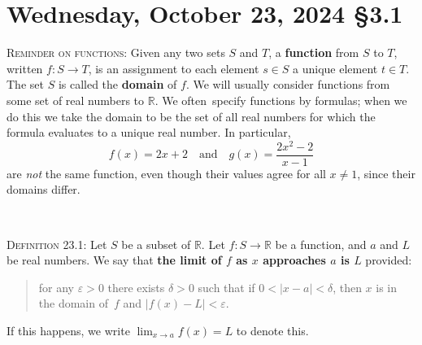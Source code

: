 \documentclass[12pt]{amsart}
\def\de{\delta}
\def\ds{\displaystyle}
\def\We{Wednesday}
\def\e{\varepsilon}
\newcommand{\R}{{\mathbb{R}}}
\numberwithin{equation}{section}
\theoremstyle{plain} %
\newcommand{\Oct}[3]{\section{#2, October #1, 2024 \quad \S#3}}
\theoremstyle{definition}
\theoremstyle{remark}
\begin{document}
\newpage

\Oct{23}{\We}{3.1}

	
\begin{framed}
\noindent	\textsc{Reminder on functions:} Given any two sets $S$ and $T$, a \textbf{function} from $S$ to $T$, written ${f: S\to T}$, is an assignment to each element $s\in S$ a unique element $t\in T$. The set $S$ is called the \textbf{domain} of $f$. We will usually consider functions from some set of real numbers to $\R$.
We often\footnotemark \
 specify functions by formulas; when we do this we take the domain to be the set of all real numbers for which the formula evaluates to a unique real number. In particular,
\[ f(x) = 2x+2 \quad \text{and} \quad g(x) = \frac{2x^2-2}{x-1}\]
are \emph{not} the same function, even though their values agree for all $x\neq 1$, since their domains differ.
	
	\
	
	
\noindent \textsc{Definition 23.1:}
Let $S$ be a subset of $\R$. Let $f: S \to \R$ be a function, and $a$ and $L$ be real numbers. We say that \textbf{the limit of $f$ as $x$ approaches $a$ is $L$} provided:
\begin{quote} for any $\e>0$ there exists $\de>0$ such that if $0< | x-a | < \de$, then $x$ is in the domain of~$f$ and $|f(x) - L| <\e$.
\end{quote}
If this happens, we write $\ds \lim_{x\to a} f(x) = L$\index{$\ds \lim_{x\to a} f(x)$} to denote this.


\end{framed}
\end{document}
